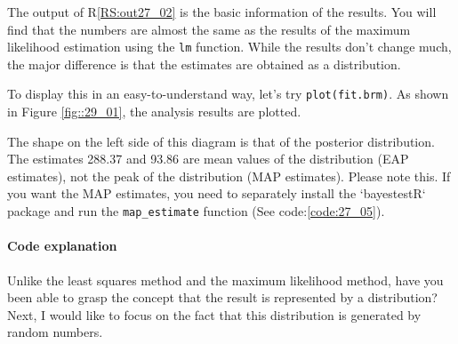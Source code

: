 \documentclass{ltjbook}
\begin{document}
The output of R\ref{RS:out27_02} is the basic information of the results. You will find that the numbers are almost the same as the results of the maximum likelihood estimation using the \texttt{lm} function. While the results don't change much, the major difference is that the estimates are obtained as a distribution.

To display this in an easy-to-understand way, let's try \texttt{plot(fit.brm)}. As shown in Figure \ref{fig::29_01}, the analysis results are plotted.

The shape on the left side of this diagram is that of the posterior distribution. The estimates 288.37 and 93.86 are mean values of the distribution (EAP estimates), not the peak of the distribution (MAP estimates). Please note this. If you want the MAP estimates, you need to separately install the `bayestestR` package and run the \verb|map_estimate| function (See code:\ref{code:27_05}).


\paragraph{Code explanation}


Unlike the least squares method and the maximum likelihood method, have you been able to grasp the concept that the result is represented by a distribution? Next, I would like to focus on the fact that this distribution is generated by random numbers.
\end{document}
